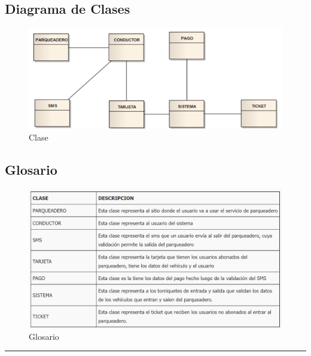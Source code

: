 \documentclass[12pt,letterpaper]{article}
\newcommand{\colorhrule}[3]{\begingroup\color{#1}\rule{#2}{#3}\endgroup}
\begin{document}
\subsection{Diagrama de Clases}
	\begin{figure}[H]
		\centering
		\includegraphics[scale=0.8]{img/ejemploclase.PNG}     
		\caption{Clase }
	\label{fig:rc}
	\end{figure}
	\vspace{1cm}


\subsection{Glosario}
	\begin{figure}[H]
		\centering
		\includegraphics[scale=0.4]{img/ejemploglosario.PNG}    
		\caption{Glosario }
	\label{fig:rc}
	\end{figure}
	\vspace{1cm}


\begin{center}
\vspace{-5mm}
\colorhrule{gris}{16.5cm}{0.7pt}
\end{center}
\end{document}
